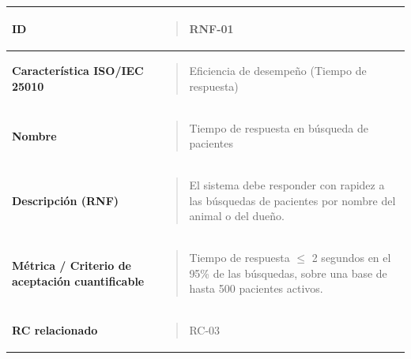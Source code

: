 \documentclass[
]{article}
\newcounter{none} %
\begin{document}
{\def\LTcaptype{none} %
\begin{longtable}[]{@{}
  >{\raggedright\arraybackslash}p{}
  >{\raggedright\arraybackslash}p{}@{}}
\toprule\noalign{}
\begin{minipage}[b]{\linewidth}\raggedright
\textbf{ID}
\end{minipage} & \begin{minipage}[b]{\linewidth}\raggedright
\begin{quote}
RNF-01
\end{quote}
\end{minipage} \\
\midrule\noalign{}
\endhead
\bottomrule\noalign{}
\endlastfoot
\textbf{Característica ISO/IEC 25010} & \begin{minipage}[t]{\linewidth}\raggedright
\begin{quote}
Eficiencia de desempeño (Tiempo de respuesta)
\end{quote}
\end{minipage} \\
\textbf{Nombre} & \begin{minipage}[t]{\linewidth}\raggedright
\begin{quote}
Tiempo de respuesta en búsqueda de pacientes
\end{quote}
\end{minipage} \\
\textbf{Descripción (RNF)} & \begin{minipage}[t]{\linewidth}\raggedright
\begin{quote}
El sistema debe responder con rapidez a las búsquedas de pacientes por
nombre del animal o del dueño.
\end{quote}
\end{minipage} \\
\textbf{Métrica / Criterio de aceptación cuantificable} & \begin{minipage}[t]{\linewidth}\raggedright
\begin{quote}
Tiempo de respuesta \(\leq\) 2 segundos en el 95\% de las búsquedas,
sobre una base de hasta 500 pacientes activos.
\end{quote}
\end{minipage} \\
\textbf{RC relacionado} & \begin{minipage}[t]{\linewidth}\raggedright
\begin{quote}
RC-03
\end{quote}
\end{minipage} \\
\end{longtable}
}
\end{document}
